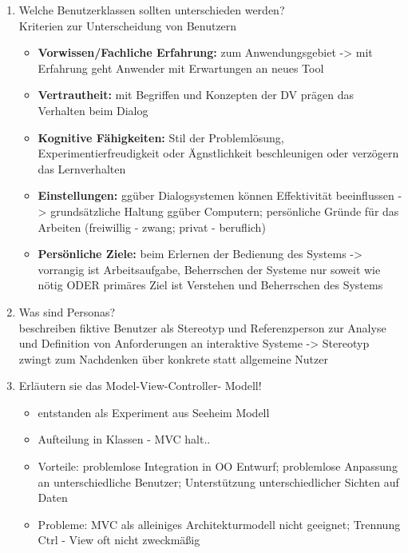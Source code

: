 \begin{enumerate}
	\item Welche Benutzerklassen sollten unterschieden werden?\\
	Kriterien zur Unterscheidung von Benutzern
	\begin{itemize}
		\item \textbf{Vorwissen/Fachliche Erfahrung:} zum Anwendungsgebiet -> mit Erfahrung geht Anwender mit Erwartungen an neues Tool
		\item \textbf{Vertrautheit:} mit Begriffen und Konzepten der DV prägen das Verhalten beim Dialog
		\item \textbf{Kognitive Fähigkeiten:} Stil der Problemlösung, Experimentierfreudigkeit oder Ägnstlichkeit beschleunigen oder verzögern das Lernverhalten
		\item \textbf{Einstellungen:} ggüber Dialogsystemen können Effektivität beeinflussen -> grundsätzliche Haltung ggüber Computern; persönliche Gründe für das Arbeiten (freiwillig - zwang; privat - beruflich)
		\item \textbf{Persönliche Ziele:} beim Erlernen der Bedienung des Systems -> vorrangig ist Arbeitsaufgabe, Beherrschen der Systeme nur soweit wie nötig ODER primäres Ziel ist Verstehen und Beherrschen des Systems
	\end{itemize}
	
	\item Was sind Personas?\\	
	beschreiben fiktive Benutzer als Stereotyp und Referenzperson zur Analyse und Definition von Anforderungen an interaktive Systeme -> Stereotyp zwingt zum Nachdenken über konkrete statt allgemeine Nutzer
	
	\item Erläutern sie das Model-View-Controller- Modell!
	\begin{itemize}
		\item entstanden als Experiment aus Seeheim Modell
		\item Aufteilung in Klassen - MVC halt..
		\item Vorteile: problemlose Integration in OO Entwurf; problemlose Anpassung an unterschiedliche Benutzer; Unterstützung unterschiedlicher Sichten auf Daten
		\item Probleme: MVC als alleiniges Architekturmodell nicht geeignet; Trennung Ctrl - View oft nicht zweckmäßig
	\end{itemize}
	

\end{enumerate}
